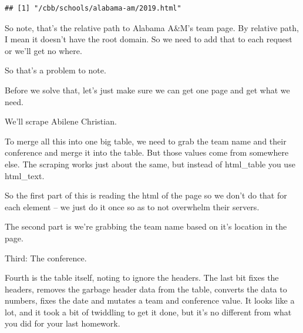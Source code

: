 \documentclass[
]{book}
\begin{document}
\begin{verbatim}
## [1] "/cbb/schools/alabama-am/2019.html"
\end{verbatim}

So note, that's the relative path to Alabama A\&M's team page. By relative path, I mean it doesn't have the root domain. So we need to add that to each request or we'll get no where.

So that's a problem to note.

Before we solve that, let's just make sure we can get one page and get what we need.

We'll scrape Abilene Christian.

To merge all this into one big table, we need to grab the team name and their conference and merge it into the table. But those values come from somewhere else. The scraping works just about the same, but instead of html\_table you use html\_text.

So the first part of this is reading the html of the page so we don't do that for each element -- we just do it once so as to not overwhelm their servers.

The second part is we're grabbing the team name based on it's location in the page.

Third: The conference.

Fourth is the table itself, noting to ignore the headers. The last bit fixes the headers, removes the garbage header data from the table, converts the data to numbers, fixes the date and mutates a team and conference value. It looks like a lot, and it took a bit of twiddling to get it done, but it's no different from what you did for your last homework.
\end{document}
